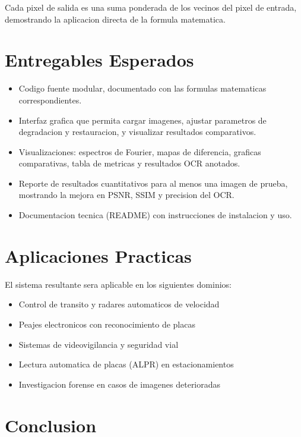 \documentclass[11pt,a4paper]{article}
\begin{document}
Cada pixel de salida es una suma ponderada de los vecinos del pixel de entrada, demostrando la aplicacion directa de la formula matematica.

\section{Entregables Esperados}

\begin{itemize}[leftmargin=*]
    \item Codigo fuente modular, documentado con las formulas matematicas correspondientes.
    \item Interfaz grafica que permita cargar imagenes, ajustar parametros de degradacion y restauracion, y visualizar resultados comparativos.
    \item Visualizaciones: espectros de Fourier, mapas de diferencia, graficas comparativas, tabla de metricas y resultados OCR anotados.
    \item Reporte de resultados cuantitativos para al menos una imagen de prueba, mostrando la mejora en PSNR, SSIM y precision del OCR.
    \item Documentacion tecnica (README) con instrucciones de instalacion y uso.
\end{itemize}

\section{Aplicaciones Practicas}

El sistema resultante sera aplicable en los siguientes dominios:

\begin{itemize}[leftmargin=*, noitemsep]
    \item Control de transito y radares automaticos de velocidad
    \item Peajes electronicos con reconocimiento de placas
    \item Sistemas de videovigilancia y seguridad vial
    \item Lectura automatica de placas (ALPR) en estacionamientos
    \item Investigacion forense en casos de imagenes deterioradas
\end{itemize}

\section{Conclusion}
\end{document}
